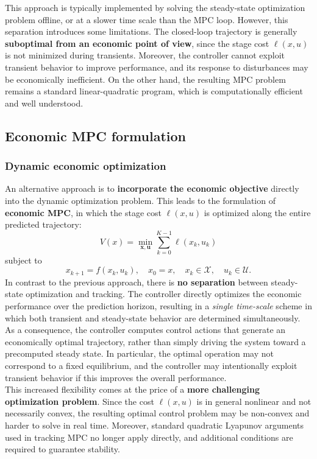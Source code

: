 This approach is typically implemented by solving the steady-state optimization problem offline, or at a slower time scale than the MPC loop. However, this separation introduces some limitations. The closed-loop trajectory is generally \textbf{suboptimal from an economic point of view}, since the stage cost $\ell(x,u)$ is not minimized during transients. Moreover, the controller cannot exploit transient behavior to improve performance, and its response to disturbances may be economically inefficient. On the other hand, the resulting MPC problem remains a standard linear-quadratic program, which is computationally efficient and well understood.\\

\subsection{Economic MPC formulation}
\subsubsection{Dynamic economic optimization}
An alternative approach is to \textbf{incorporate the economic objective} directly into the dynamic optimization problem. This leads to the formulation of \textbf{economic MPC}, in which the stage cost $\ell(x,u)$ is optimized along the entire predicted trajectory:
\[
V(x) = \min_{\mathbf{x},\mathbf{u}} \sum_{k=0}^{K-1} \ell(x_k,u_k)
\]
subject to
\[
x_{k+1} = f(x_k,u_k), \quad x_0 = x, \quad x_k \in \mathcal{X}, \quad u_k \in \mathcal{U}.
\]
In contrast to the previous approach, there is \textbf{no separation} between steady-state optimization and tracking. The controller directly optimizes the economic performance over the prediction horizon, resulting in a \emph{single time-scale} scheme in which both transient and steady-state behavior are determined simultaneously.\\

As a consequence, the controller computes control actions that generate an economically optimal trajectory, rather than simply driving the system toward a precomputed steady state. In particular, the optimal operation may not correspond to a fixed equilibrium, and the controller may intentionally exploit transient behavior if this improves the overall performance.\\
This increased flexibility comes at the price of a \textbf{more challenging optimization problem}. Since the cost $\ell(x,u)$ is in general nonlinear and not necessarily convex, the resulting optimal control problem may be non-convex and harder to solve in real time. Moreover, standard quadratic Lyapunov arguments used in tracking MPC no longer apply directly, and additional conditions are required to guarantee stability.\\

